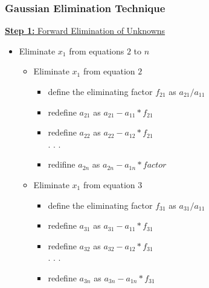 \documentclass[fleqn]{beamer} %
\newcommand{\sectionIVsubsectionIItitle}{Gaussian Elimination Technique}
\begin{document}
			\begin{frame}
				\frametitle{\sectionIVsubsectionIItitle}
				\bigskip

				\underline{{\bf Step 1:} Forward Elimination of Unknowns}
		
				\begin{itemize}
					\item  Eliminate $x_1$ from equations $2$ to $n$
						\begin{itemize}
							\item Eliminate $x_1$ from equation $2$
								\begin{itemize}
									\item define the eliminating factor $f_{21}$ as $a_{21}/a_{11}$
									\item redefine $a_{21}$ as $a_{21}-a_{11}*f_{21}$
									\item redefine $a_{22}$ as $a_{22}-a_{12}*f_{21}$ \\
									. . . 
									\item redifine $a_{2n}$ as $a_{2n}-a_{1n}*factor$ \\
								\end{itemize}
							\item Eliminate $x_1$ from equation $3$
								\begin{itemize}
									\item define the eliminating factor $f_{31}$ as $a_{31}/a_{11}$
									\item redefine $a_{31}$ as $a_{31}-a_{11}*f_{31}$
									\item redefine $a_{32}$ as $a_{32}-a_{12}*f_{31}$ \\
									 . . .
									\item redefine $a_{3n}$ as $a_{3n}-a_{1n}*f_{31}$ \\
								\end{itemize}	
						\end{itemize}
				\end{itemize}

				\btVFill
			\end{frame}	
\end{document}
